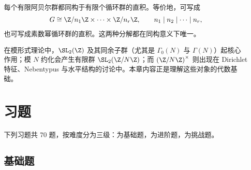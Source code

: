 \begin{theorem}[有限阿贝尔群结构定理，陈述]
每个有限阿贝尔群都同构于有限个循环群的直积。等价地，可写成
\[
 G \cong \Z/n_1\Z \times \cdots \times \Z/n_r\Z, \qquad n_1\mid n_2\mid \cdots \mid n_r,
\]
也可写成素数幂循环群的直积。这两种分解都在同构意义下唯一。
\end{theorem}

\begin{remark}[与模形式的联系]
在模形式理论中，$\SL_2(\Z)$ 及其同余子群（尤其是 $\Gamma_0(N)$ 与 $\Gamma(N)$）起核心作用；模 $N$ 约化会产生有限群 $\SL_2(\Z/N\Z)$；而 $\left(\Z/N\Z\right)^\times$ 则出现在 Dirichlet 特征、Nebentypus 与水平结构的讨论中。本章内容正是理解这些对象的代数基础。
\end{remark}

\section*{习题}

下列习题共 $70$ 题，按难度分为三级：\basic 为基础题，\medium 为进阶题，\hard 为挑战题。

\subsection*{基础题}

